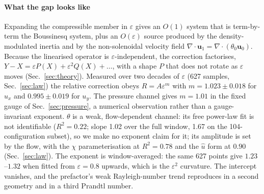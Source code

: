 \documentclass[preprint,11pt,a4paper,times,doubleblind]{elsarticle}
\begin{document}
\paragraph{What the gap looks like} Expanding the compressible member in $\varepsilon$ gives an
$O(1)$ system that is term-by-term the Boussinesq system, plus an $O(\varepsilon)$ source produced
by the density-modulated inertia and by the non-solenoidal velocity field
$\nabla\cdot\bm{u}_1=\nabla\cdot(\theta_0\bm{u}_0)$. Because the linearised operator is
$\varepsilon$-independent, the correction factorises,
$Y-X=\varepsilon P(X)+\varepsilon^2Q(X)+\dots$, with a shape $P$ that does not rotate as
$\varepsilon$ moves (Sec.~\ref{sec:theory}). Measured over two decades of $\varepsilon$ (627
samples, Sec.~\ref{sec:law}) the relative correction obeys $R=A\varepsilon^m$ with
$m=1.023\pm0.018$ for $u_x$ and $0.995\pm0.019$ for $u_y$. The pressure channel gives $m=1.01$ in the fixed gauge of
Sec.~\ref{sec:pressure}, a numerical observation rather than a gauge-invariant exponent. $\theta$
is a weak, flow-dependent channel: its free power-law fit is not identifiable ($R^2=0.22$; slope
1.02 over the full window, 1.67 on the 104-configuration subset), so we make no exponent claim for
it; its amplitude is set by the flow, with the $\chi$ parameterisation at $R^2=0.78$ and the
$\hat u$ form at $0.90$ (Sec.~\ref{sec:law}). The exponent is
window-averaged: the same 627 points give $1.23$--$1.32$ when fitted from $\varepsilon=0.8$
upwards, which is the $\varepsilon^2$ curvature. The intercept vanishes, and the prefactor's weak
Rayleigh-number trend reproduces in a second geometry and in a third Prandtl number.
\end{document}

